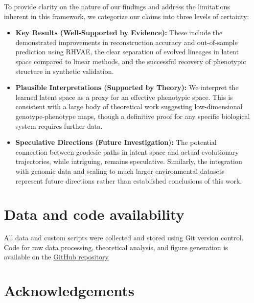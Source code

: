 \documentclass[
]{scrartcl}
\providecommand{\tightlist}{%
  \setlength{\itemsep}{0pt}\setlength{\parskip}{0pt}}
\begin{document}
\begin{refsegment}
\textcolor{tempcolor}{ To provide
clarity on the nature of our findings and address the limitations
inherent in this framework, we categorize our claims into three levels
of certainty: }

\begin{itemize}
\tightlist
\item
  \textbf{Key Results (Well-Supported by Evidence):}
  \textcolor{tempcolor}{ These
  include the demonstrated improvements in reconstruction accuracy and
  out-of-sample prediction using RHVAE, the clear separation of evolved
  lineages in latent space compared to linear methods, and the
  successful recovery of phenotypic structure in synthetic validation. }
\item
  \textbf{Plausible Interpretations (Supported by Theory):}
  \textcolor{tempcolor}{ We
  interpret the learned latent space as a proxy for an effective
  phenotypic space. This is consistent with a large body of theoretical
  work suggesting low-dimensional genotype-phenotype maps, though a
  definitive proof for any specific biological system requires further
  data. }
\item
  \textbf{Speculative Directions (Future Investigation):}
  \textcolor{tempcolor}{ The
  potential connection between geodesic paths in latent space and actual
  evolutionary trajectories, while intriguing, remains speculative.
  Similarly, the integration with genomic data and scaling to much
  larger environmental datasets represent future directions rather than
  established conclusions of this work. }
\end{itemize}

\section*{Data and code availability}\label{data-and-code-availability}

All data and custom scripts were collected and stored using Git version
control. Code for raw data processing, theoretical analysis, and figure
generation is available on the
\href{https://github.com/mrazomej/antibiotic_landscape}{GitHub
repository}

\section*{Acknowledgements}\label{acknowledgements}


\end{refsegment}
\end{document}

